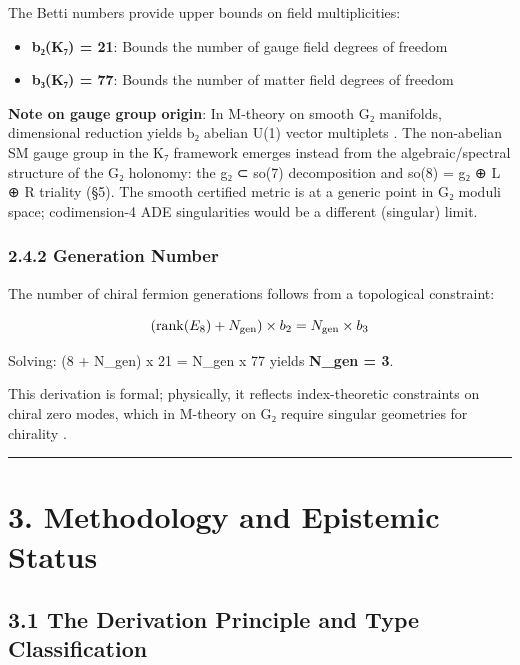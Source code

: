 \documentclass[11pt,a4paper]{article}
\begin{document}
The Betti numbers provide upper bounds on field multiplicities:

\begin{itemize}
\tightlist
\item
  \textbf{b₂(K₇) = 21}: Bounds the number of gauge field degrees of freedom
\item
  \textbf{b₃(K₇) = 77}: Bounds the number of matter field degrees of freedom
\end{itemize}

\textbf{Note on gauge group origin}: In M-theory on smooth G₂ manifolds, dimensional reduction yields b₂ abelian U(1) vector multiplets \cite{11}. The non-abelian SM gauge group in the K₇ framework emerges instead from the algebraic/spectral structure of the G₂ holonomy: the g₂ ⊂ so(7) decomposition and so(8) = g₂ ⊕ L ⊕ R triality (§5). The smooth certified metric is at a generic point in G₂ moduli space; codimension-4 ADE singularities would be a different (singular) limit.

\subsubsection{2.4.2 Generation Number}\label{generation-number}

The number of chiral fermion generations follows from a topological constraint:

\[({\rm rank}(E_8) + N_{\rm gen}) \times b_2 = N_{\rm gen} \times b_3\]

Solving: (8 + N\_\allowbreak{}gen) x 21 = N\_\allowbreak{}gen x 77 yields \textbf{N\_\allowbreak{}gen = 3}.

This derivation is formal; physically, it reflects index-theoretic constraints on chiral zero modes, which in M-theory on G₂ require singular geometries for chirality \cite{25}.

\begin{center}\rule{\linewidth}{0.5pt}\end{center}

\section{3. Methodology and Epistemic Status}\label{methodology-and-epistemic-status}

\subsection{3.1 The Derivation Principle and Type Classification}\label{the-derivation-principle-and-type-classification}
\end{document}
